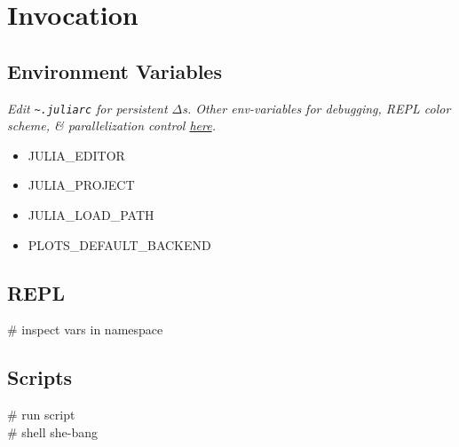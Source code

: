 \section{Invocation}

\subsection*{Environment Variables}
\textit{Edit \texttt{\textasciitilde .juliarc} for persistent $\Delta$s. Other env-variables for debugging, REPL color scheme, \& parallelization control \href{https://docs.julialang.org/en/v1/manual/environment-variables/index.html}{here}.}
\begin{itemize}
    \item JULIA\_EDITOR
    \item JULIA\_PROJECT
    \item JULIA\_LOAD\_PATH
    \item PLOTS\_DEFAULT\_BACKEND
\end{itemize}


\subsection*{REPL}
 \# inspect vars in namespace 



\subsection*{Scripts}
 \# run script \\
 \# shell she-bang \\
